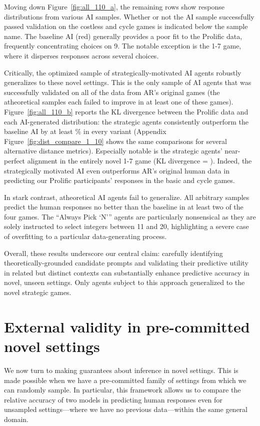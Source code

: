 \documentclass[11pt]{article}
\theoremstyle{definition}
\newcommand{\aisub}{AI agent}
\newcommand{\persona}{prompt}
\begin{document}
Moving down Figure~\ref{fig:all_110_a}, the remaining rows show response distributions from various AI samples.
Whether or not the AI sample successfully passed validation on the costless and cycle games is indicated below the sample name.
The baseline AI (red) generally provides a poor fit to the Prolific data, frequently concentrating choices on 9. 
The notable exception is the 1-7 game, where it disperses responses across several choices.

Critically, the optimized sample of strategically-motivated \aisub{s} robustly generalizes to these novel settings.
This is the only sample of \aisub{s} that was successfully validated on all of the data from AR's original games (the atheoretical samples each failed to improve in at least one of these games).
Figure~\ref{fig:all_110_b} reports the KL divergence between the Prolific data and each AI-generated distribution: the strategic agents consistently outperform the baseline AI by at least \MinPercImproveArad\% in every variant (Appendix Figure~\ref{fig:dist_compare_1_10} shows the same comparisons for several alternative distance metrics). 
Especially notable is the strategic agents' near-perfect alignment in the entirely novel 1-7 game (KL divergence = \KlHumanOptDistSeven). 
Indeed, the strategically motivated AI even outperforms AR's original human data in predicting our Prolific participants' responses in the basic and cycle games.

In stark contrast, atheoretical \aisub{s} fail to generalize.
All arbitrary samples predict the human responses no better than the baseline in at least two of the four games.
The  ``Always Pick `N''' agents are particularly nonsensical as they are solely instructed to select integers between 11 and 20, 
highlighting a severe case of overfitting to a particular data-generating process.

Overall, these results underscore our central claim: carefully identifying theoretically-grounded candidate \persona{s} and validating their predictive utility in related but distinct contexts can substantially enhance predictive accuracy in novel, unseen settings.
Only agents subject to this approach generalized to the novel strategic games. 

\section{External validity in pre-committed novel settings}
\label{sec:ext-valid}

We now turn to making guarantees about inference in novel settings.
This is made possible when we have a pre-committed family of settings from which we can randomly sample.
In particular, this framework allows us to compare the relative accuracy of two models in predicting human responses even for unsampled settings---where we have no previous data---within the same general domain.
\end{document}
